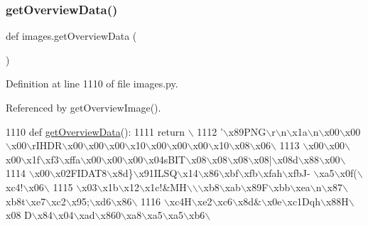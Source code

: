 \subsubsection{\texorpdfstring{get\+Overview\+Data()}{getOverviewData()}}
{\footnotesize\ttfamily def images.\+get\+Overview\+Data (\begin{DoxyParamCaption}{ }\end{DoxyParamCaption})}



Definition at line 1110 of file images.\+py.



Referenced by get\+Overview\+Image().


\begin{DoxyCode}
1110 \textcolor{keyword}{def }\hyperlink{namespaceimages_ac431d64f5cb525f4d569389b880983b9}{getOverviewData}():
1111     \textcolor{keywordflow}{return} \(\backslash\)
1112 \textcolor{stringliteral}{'\(\backslash\)x89PNG\(\backslash\)r\(\backslash\)n\(\backslash\)x1a\(\backslash\)n\(\backslash\)x00\(\backslash\)x00\(\backslash\)x00\(\backslash\)rIHDR\(\backslash\)x00\(\backslash\)x00\(\backslash\)x00\(\backslash\)x10\(\backslash\)x00\(\backslash\)x00\(\backslash\)x00\(\backslash\)x10\(\backslash\)x08\(\backslash\)x06\(\backslash\)}
1113 \textcolor{stringliteral}{\(\backslash\)x00\(\backslash\)x00\(\backslash\)x00\(\backslash\)x1f\(\backslash\)xf3\(\backslash\)xffa\(\backslash\)x00\(\backslash\)x00\(\backslash\)x00\(\backslash\)x04sBIT\(\backslash\)x08\(\backslash\)x08\(\backslash\)x08\(\backslash\)x08|\(\backslash\)x08d\(\backslash\)x88\(\backslash\)x00\(\backslash\)}
1114 \textcolor{stringliteral}{\(\backslash\)x00\(\backslash\)x02FIDAT8\(\backslash\)x8d\}\(\backslash\)x91ILSQ\(\backslash\)x14\(\backslash\)x86\(\backslash\)xbf\(\backslash\)xfb\(\backslash\)xfah\(\backslash\)xfbJ- \(\backslash\)xa5\(\backslash\)x0f(\(\backslash\)xc4!\(\backslash\)x06\(\backslash\)}
1115 \textcolor{stringliteral}{\(\backslash\)x03\(\backslash\)x1b\(\backslash\)x12\(\backslash\)x1c!&MH\(\backslash\)\(\backslash\)\(\backslash\)xb8\(\backslash\)xab\(\backslash\)x89F\(\backslash\)xbb\(\backslash\)xea\(\backslash\)n\(\backslash\)x87\(\backslash\)xb8t\(\backslash\)xe7\(\backslash\)xc2\(\backslash\)x95;\(\backslash\)xd6\(\backslash\)x86\(\backslash\)}
1116 \textcolor{stringliteral}{\(\backslash\)xc4H\(\backslash\)xe2\(\backslash\)xc6\(\backslash\)x8d&\(\backslash\)x0e\(\backslash\)xc1Dqh\(\backslash\)x88H\(\backslash\)x08 D\(\backslash\)x84\(\backslash\)x04\(\backslash\)xad\(\backslash\)x860\(\backslash\)xa8\(\backslash\)xa5\(\backslash\)xa5\(\backslash\)xb6\(\backslash\)}

\end{DoxyCode}
